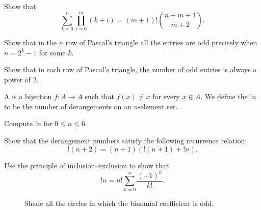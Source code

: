 \begin{challenge}
  \exercise Show that
  \begin{equation*}
    \sum_{k=0}^n\prod_{i=0}^m (k+i) = (m+1)!\binom{n+m+1}{m+2}.
  \end{equation*}
  \exercise
  \begin{subexenum}
  \item Show that in the $n$\supth{} row of Pascal's triangle all the entries are odd precisely when $n=2^k-1$ for some $k$.
  \item Show that in each row of Pascal's triangle, the number of odd entries is always a power of $2$.
  \end{subexenum}
  \exercise A  is a bijection $f:A\to A$ such that $f(x)\neq x$ for every $x\in A$. We define the  $!n$ to be the number of derangements on an $n$-element set.
  \begin{subexenum}
  \item Compute $!n$ for $0\leq n\leq 6$.
  \item Show that the derangement numbers satisfy the following recurrence relation:
    \begin{equation*}
      {!(n+2)}=(n+1)({!(n+1)}+{!n}).
    \end{equation*}
  \item Use the principle of inclusion--exclusion to show that
    \begin{equation*}
      !n= {n!}\sum_{k=0}^n \frac{(-1)^k}{k!}.
    \end{equation*}
  \end{subexenum}
\end{challenge}

\cleardoublepage

\thispagestyle{empty}

\begin{figure}[p]

  \caption[Parity in Pascal's triangle]
  {Shade all the circles in which the binomial coefficient is odd.}
  \label{figure:parity-pascals-triangle}
\end{figure}

\clearpage

\thispagestyle{empty}


